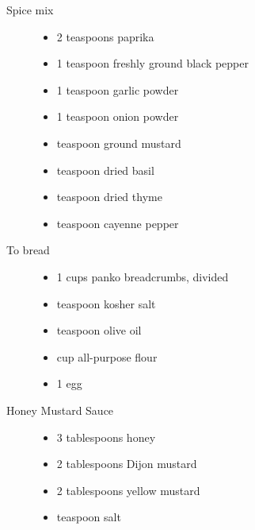 \begin{description}
  \item[Spice mix]\hfill
    \begin{itemize}
    \item 2 teaspoons paprika
    \item 1 teaspoon freshly ground black pepper
    \item 1 teaspoon garlic powder
    \item 1 teaspoon onion powder
    \item {} teaspoon ground mustard
    \item {} teaspoon dried basil
    \item {} teaspoon dried thyme
    \item {} teaspoon cayenne pepper%
    \end{itemize}
  \item[To bread]\hfill
    \begin{itemize}
    \item 1 cups panko breadcrumbs, divided
    \item {} teaspoon kosher salt
    \item {} teaspoon olive oil
    \item {} cup all-purpose flour%
    \item 1 egg
    \end{itemize}
  \item[Honey Mustard Sauce]\hfill
    \begin{itemize}
    \item 3 tablespoons honey
    \item 2 tablespoons Dijon mustard
    \item 2 tablespoons yellow mustard
    \item {} teaspoon salt
    \end{itemize}
  \end{description}

